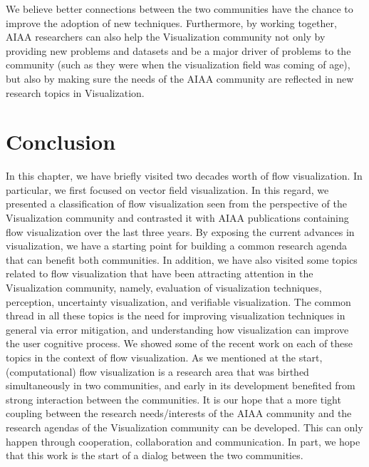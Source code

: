 We believe better connections between the two communities have the
chance to improve the adoption of new techniques.  Furthermore, by
working together, AIAA researchers can also help the Visualization community not
only by providing new problems and datasets and be a major driver of
problems to the community (such as they were when the visualization
field was coming of age), but also by making sure the needs of the
AIAA community are reflected in new research topics in Visualization.


\section{Conclusion}
\label{sec:conclusions}

In this chapter, we have briefly visited two decades worth of flow visualization.
%
In particular, we first focused on vector field visualization. In this regard, we presented a classification of flow visualization seen from the perspective of the Visualization community and contrasted it with AIAA publications containing flow visualization over the last three years. By exposing the current advances in visualization, we have a starting point for building a common research agenda that can benefit both communities.
%
In addition, we have also visited some topics related to flow visualization that have been attracting attention  in the Visualization community, namely, evaluation of visualization techniques, perception, uncertainty visualization, and verifiable visualization.  The common thread in all these topics is the need for improving  visualization techniques in general via error mitigation, and understanding how visualization can improve the user cognitive process. We showed some of the recent work on each of these topics in the context of flow visualization.
%
As we mentioned at the start, (computational) flow visualization is a research area that was birthed simultaneously in
two communities, and early in its development benefited from strong interaction between the communities.  It is our hope
that a more tight coupling between the research needs/interests of the AIAA community and the research agendas of the
Visualization community can be developed.  This can only happen through cooperation, collaboration and communication.  
In part, we hope that this work is the start of a dialog between the two communities.

%
